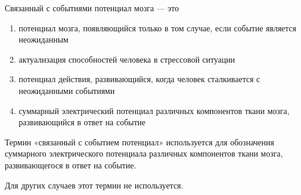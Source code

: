 
Связанный с событиями потенциал мозга — это

\begin{enumerate}
    \item потенциал мозга, появляющийся только в том случае, если событие является неожиданным
    \item актуализация способностей человека в стрессовой ситуации
    \item потенциал действия, развивающийся, когда человек сталкивается с неожиданными событиями
    \item суммарный электрический потенциал различных компонентов ткани мозга, развивающийся в ответ на событие
\end{enumerate}

\explanationSection

Термин «связанный с событием потенциал» используется для обозначения суммарного электрического потенциала различных компонентов ткани мозга, развивающегося в ответ на событие. 

Для других случаев этот термин не используется.


